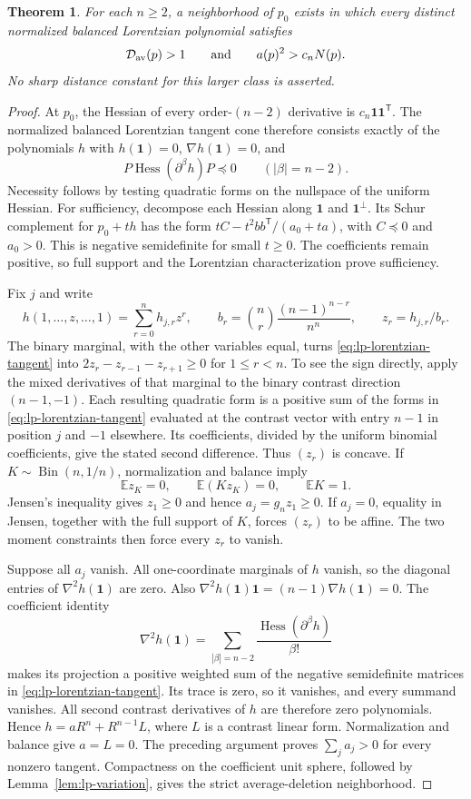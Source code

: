 \documentclass[11pt,a4paper]{article}
\newtheorem{theorem}{Theorem}[section]
\theoremstyle{definition}
\theoremstyle{remark}
\newcommand{\T}{\mathsf{T}}
\begin{document}
\begin{theorem}\label{thm:lp-lorentzian-local}
For each $n\ge2$, a neighborhood of $p_0$ exists in which every distinct normalized balanced Lorentzian polynomial satisfies
\[
 \mathcal D_{\rm av}(p)>1\qquad\hbox{and}\qquad a(p)^2>c_nN(p).
\]
No sharp distance constant for this larger class is asserted.
\end{theorem}
\begin{proof}
At $p_0$, the Hessian of every order-$(n-2)$ derivative is $c_n\mathbf1\mathbf1^\T$.
The normalized balanced Lorentzian tangent cone therefore consists exactly of the polynomials $h$ with $h(\mathbf1)=0$, $\nabla h(\mathbf1)=0$, and
\begin{equation}\label{eq:lp-lorentzian-tangent}
 P\operatorname{Hess}(\partial^\beta h)P\preceq0\qquad(|\beta|=n-2).
\end{equation}
Necessity follows by testing quadratic forms on the nullspace of the uniform Hessian.
For sufficiency, decompose each Hessian along $\mathbf1$ and $\mathbf1^\perp$.
Its Schur complement for $p_0+th$ has the form
$tC-t^2bb^\T/(a_0+ta)$, with $C\preceq0$ and $a_0>0$.
This is negative semidefinite for small $t\ge0$.
The coefficients remain positive, so full support and the Lorentzian characterization prove sufficiency.

Fix $j$ and write
\[
 h(1,\ldots,z,\ldots,1)=\sum_{r=0}^nh_{j,r}z^r,\qquad
 b_r=\binom nr\frac{(n-1)^{n-r}}{n^n},\qquad z_r=h_{j,r}/b_r.
\]
The binary marginal, with the other variables equal, turns \eqref{eq:lp-lorentzian-tangent} into
$2z_r-z_{r-1}-z_{r+1}\ge0$ for $1\le r<n$.
To see the sign directly, apply the mixed derivatives of that marginal to the binary contrast direction $(n-1,-1)$.
Each resulting quadratic form is a positive sum of the forms in \eqref{eq:lp-lorentzian-tangent} evaluated at the contrast vector with entry $n-1$ in position $j$ and $-1$ elsewhere.
Its coefficients, divided by the uniform binomial coefficients, give the stated second difference.
Thus $(z_r)$ is concave.
If $K\sim\operatorname{Bin}(n,1/n)$, normalization and balance imply
\[
 \mathbb Ez_K=0,\qquad \mathbb E(Kz_K)=0,\qquad \mathbb EK=1.
\]
Jensen's inequality gives $z_1\ge0$ and hence $a_j=g_nz_1\ge0$.
If $a_j=0$, equality in Jensen, together with the full support of $K$, forces $(z_r)$ to be affine.
The two moment constraints then force every $z_r$ to vanish.

Suppose all $a_j$ vanish.
All one-coordinate marginals of $h$ vanish, so the diagonal entries of $\nabla^2h(\mathbf1)$ are zero.
Also $\nabla^2h(\mathbf1)\mathbf1=(n-1)\nabla h(\mathbf1)=0$.
The coefficient identity
\[
 \nabla^2h(\mathbf1)=\sum_{|\beta|=n-2}\frac{\operatorname{Hess}(\partial^\beta h)}{\beta!}
\]
makes its projection a positive weighted sum of the negative semidefinite matrices in \eqref{eq:lp-lorentzian-tangent}.
Its trace is zero, so it vanishes, and every summand vanishes.
All second contrast derivatives of $h$ are therefore zero polynomials.
Hence $h=aR^n+R^{n-1}L$, where $L$ is a contrast linear form.
Normalization and balance give $a=L=0$.
The preceding argument proves $\sum_j a_j>0$ for every nonzero tangent.
Compactness on the coefficient unit sphere, followed by Lemma~\ref{lem:lp-variation}, gives the strict average-deletion neighborhood.


\end{proof}
\end{document}
